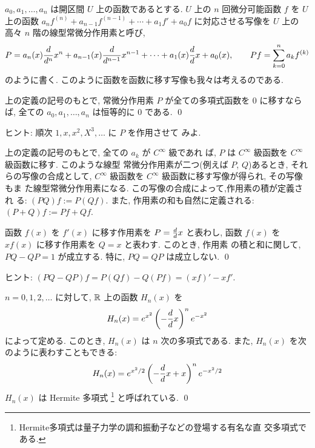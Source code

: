 \documentclass[12pt,twoside]{jarticle}
\begin{document}
\begin{Definition}[線型常微分作用素]
  $a_0,a_1,\dots,a_n$ は開区間 $U$ 上の函数であるとする. $U$ 上の $n$ %
  回微分可能函数 $f$ を $U$ 上の函数 %
  $a_n f^{(n)} + a_{n-1} f^{(n-1)} + \cdots + a_1 f' + a_0 f$ %
  に対応させる写像を $U$ 上の高々 $n$ 階の線型常微分作用素と呼び, 
  \[
     P = a_n(x)\frac{d}{d ^n}{x^n} + a_{n-1}(x)\frac{d}{d ^{n-1}}{x^{n-1}} 
         + \cdots + a_1(x)\frac{d}{d }{x} + a_0(x),
     \qquad
     Pf = \sum_{k=0}^n a_k f^{(k)}
  \] %
  のように書く. このように函数を函数に移す写像も我々は考えるのである.
\end{Definition}

\begin{question}
  上の定義の記号のもとで, 常微分作用素 $P$ が全ての多項式函数を %
  $0$ に移すならば, 全ての $a_0,a_1,\dots,a_n$ は恒等的に $0$ である.
  \qed
\end{question}

\noindent ヒント: 順次 $1, x, x^2, X^3, \ldots$ に $P$ を作用させて
みよ.

\noindent 上の定義の記号のもとで, 全ての $a_k$ が $C^\infty$ 級であれ
ば, $P$ は $C^\infty$ 級函数を $C^\infty$ 級函数に移す. このような線型
常微分作用素が二つ(例えば $P$, $Q$)あるとき, それらの写像の合成として, %
$C^\infty$ 級函数を $C^\infty$ 級函数に移す写像が得られ, その写像もま
た線型常微分作用素になる. この写像の合成によって,作用素の積が定義され
る: $(PQ)f := P(Qf)$. %
また, 作用素の和も自然に定義される: $(P + Q)f := Pf + Qf$.

\begin{question}[正準交換関係]
  函数 $f(x)$ を $f'(x)$ に移す作用素を $P = \frac{d}{d }{x}$ と表わし, 函数 %
  $f(x)$ を $xf(x)$ に移す作用素を $Q = x$ と表わす. このとき, 作用素
  の積と和に関して, $PQ-QP=1$ が成立する. 特に, $PQ = QP$ は成立しない.
  \qed
\end{question}

\noindent ヒント: $(PQ-QP)f = P(Qf) - Q(Pf) = (xf)' - xf'$.

\begin{question}[Hermite多項式の定義]
  $n=0,1,2,\ldots$ に対して, ${\mathbb R}$ 上の函数 $H_n(x)$ を
  \[
    H_n(x) = e^{x^2} \left( - \frac{d}{d }{x} \right)^n e^{-x^2}
  \] %
  によって定める. このとき, $H_n(x)$ は $n$ 次の多項式である. また, %
  $H_n(x)$ を次のように表わすこともできる:
  \[
    H_n(x) = e^{x^2/2} \left( - \frac{d}{d }{x} + x \right)^n e^{-x^2/2}
  \]
  $H_n(x)$ は Hermite 多項式%
  \footnote{Hermite多項式は量子力学の調和振動子などの登場する有名な直
    交多項式である. }
  と呼ばれている. \qed
\end{question}
\end{document}
